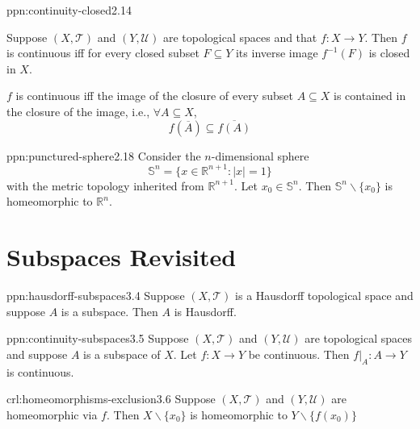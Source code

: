 \documentclass[landscape, 8pt]{extarticle}
\begin{document}
\begin{multicols}{3}
\begin{ppn}{ppn:continuity-closed}{2.14}
\begin{itemize-zero}
\item Suppose $(X, \mathcal{T})$ and $(Y, \mathcal{U})$ are topological spaces and that $f : X \to Y$. Then $f$ is continuous iff for every closed subset $F \subseteq Y$ its inverse image $f^{-1}(F)$ is closed in $X$.
\item $f$ is continuous iff the image of the closure of every subset $A \subseteq X$ is contained in the closure of the image, i.e., $\forall A \subseteq X$,
\[f(\overline{A}) \subseteq \overline{f(A)}\]
\end{itemize-zero}
\end{ppn}

\newpage
\begin{ppn}{ppn:punctured-sphere}{2.18}
	Consider the $n$-dimensional sphere
	\[\mathbb{S}^{n} = \{x\in \mathbb{R}^{n+1} : \lvert x \rvert = 1\}\]
	with the metric topology inherited from $\mathbb{R}^{n+1}$. Let $x_{0} \in \mathbb{S}^{n}$. Then $\mathbb{S}^{n} \backslash \{x_{0}\}$ is homeomorphic to $\mathbb{R}^{n}$.
\end{ppn}



\section{Subspaces Revisited}

\begin{ppn}{ppn:hausdorff-subspaces}{3.4}
	Suppose $(X, \mathcal{T})$ is a Hausdorff topological space and suppose $A$ is a subspace. Then $A$ is Hausdorff.
\end{ppn}

\begin{ppn}{ppn:continuity-subspaces}{3.5}
	Suppose $(X, \mathcal{T})$ and $(Y, \mathcal{U})$ are topological spaces and suppose $A$ is a subspace of $X$. Let $f: X \to Y $ be continuous. Then $f \rvert_{A} : A \to Y$ is continuous.
\end{ppn}

\begin{crl}{crl:homeomorphisms-exclusion}{3.6}
	Suppose $(X, \mathcal{T})$ and $(Y, \mathcal{U})$ are homeomorphic via $f$. Then $X \backslash \{x_{0}\}$ is homeomorphic to $Y \backslash \{f(x_{0})\}$
\end{crl}


\end{multicols}
\end{document}

